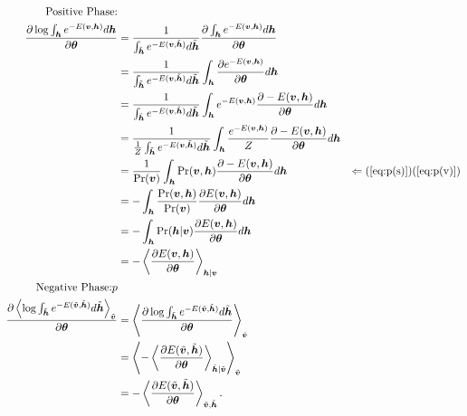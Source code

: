 \documentclass[11pt]{article}
\newcommand{\mean}[2]{\left\langle{#1}\right\rangle_{#2}}
\newcommand{\vh}{\boldsymbol{h}}
\newcommand{\vv}{\boldsymbol{v}}
\newcommand{\vht}{\tilde{\vh}}
\newcommand{\vvt}{\tilde{\vv}}
\newcommand{\pEC}{\boldsymbol{\theta}}
\newcommand{\PDV}[2]{\frac{\partial #1}{\partial #2}}
\begin{document}
\begin{align*}
  \textrm{Positive Phase:}
  & \\
  \PDV{\log{\int_{\vh}{e^{-E(\vv, \vh)}d\vh}}}{\pEC} 
  & = \frac{1}{\int_{\vht} e^{-E(\vv, \vht)} d\vht}   \PDV{\int_{\vh} e^{-E(\vv, \vh)} d\vh}{\pEC}  \\
  & = \frac{1}{\int_{\vht} e^{-E(\vv, \vht)} d\vht}   \int_{\vh} \PDV{ e^{-E(\vv, \vh)}}{\pEC} d\vh \\
  & = \frac{1}{\int_{\vht} e^{-E(\vv, \vht)} d\vht}   \int_{\vh} e^{-E(\vv, \vh)}\PDV{-E(\vv, \vh)}{\pEC} d\vh \\
  & = \frac{1}{ \frac{1}{Z}  \int_{\vht} e^{-E(\vv, \vht)} d\vht}  \int_{\vh} \frac{e^{-E(\vv, \vh)}}{Z} \PDV{-E(\vv, \vh)}{\pEC} d\vh \\
  & = \frac{1}{\Pr(\vv)}  \int_{\vh} \Pr(\vv, \vh)\PDV{-E(\vv, \vh)}{\pEC} d\vh  & \Leftarrow (\ref{eq:p(s)})(\ref{eq:p(v)}) \\
  & = -\int_{\vh} \frac{\Pr(\vv, \vh)}{\Pr(\vv)} \PDV{E(\vv, \vh)}{\pEC} d\vh \\
  & = -\int_{\vh} \Pr(\vh | \vv) \PDV{E(\vv, \vh)}{\pEC}  d\vh \\
  & = -\mean{\PDV{E(\vv, \vh)}{\pEC}}{\vh|\vv} \\
  \textrm{Negative Phase:}p
  & \\
  \PDV{\mean{\log{\int_{\vht}{e^{-E(\vvt, \vht)}d\vht}}}{\vvt}}{\pEC}
  &= \mean{\PDV{\log{\int_{\vht}{e^{-E(\vvt, \vht)}d\vht}}}{\pEC}}{\vvt} \\
  &= \mean{ -\mean{\PDV{E(\vvt, \vht)}{\pEC}}{\vht|\vvt}  }{\vvt} \\
  &= -\mean{\PDV{E(\vvt, \vht)}{\pEC}}{\vvt, \vht}.
\end{align*} 
\end{document}
